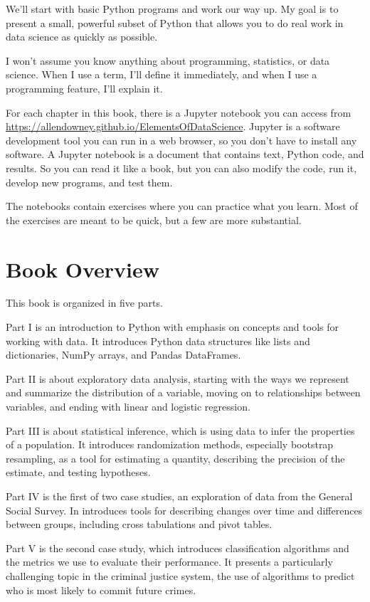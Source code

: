 We'll start with basic Python programs and work our way up.
My goal is to present a small,
powerful subset of Python that allows you to do real work in data
science as quickly as possible.

I won't assume you know anything about programming,
statistics, or data science. When I use a term, I'll define it
immediately, and when I use a programming feature, I'll explain it.

For each chapter in this book, there is a Jupyter notebook you can access from \url{https://allendowney.github.io/ElementsOfDataScience}. Jupyter is a software
development tool you can run in a web browser, so you don't have to
install any software. A Jupyter notebook is a document that contains
text, Python code, and results. So you can read it like a book, but you
can also modify the code, run it, develop new programs, and test them.

The notebooks contain exercises where you can practice what you learn.
Most of the exercises are meant to be quick, but a few are more
substantial.

\section{Book Overview}

This book is organized in five parts.

Part I is an introduction to Python with emphasis on concepts and tools for working with data. It introduces Python data structures like lists and dictionaries, NumPy arrays, and Pandas DataFrames.

Part II is about exploratory data analysis, starting with the ways we represent and summarize the distribution of a variable, moving on to relationships between variables, and ending with linear and logistic regression.

Part III is about statistical inference, which is using data to infer the properties of a population. It introduces randomization methods, especially bootstrap resampling, as a tool for estimating a quantity, describing the precision of the estimate, and testing hypotheses.

Part IV is the first of two case studies, an exploration of data from the General Social Survey. In introduces tools for describing changes over time and differences between groups, including cross tabulations and pivot tables.

Part V is the second case study, which introduces classification algorithms and the metrics we use to evaluate their performance. It presents a particularly challenging topic in the criminal justice system, the use of algorithms to predict who is most likely to commit future crimes.

